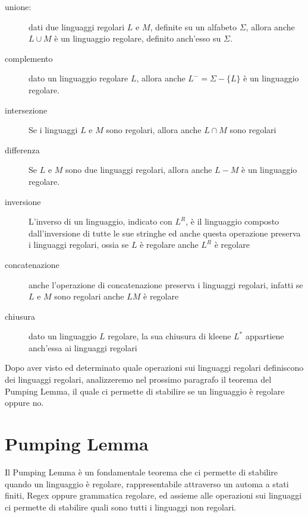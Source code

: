 \documentclass[a4paper]{book}
\theoremstyle{definition}%
\begin{document}
\begin{description}
\item [unione:] dati due linguaggi regolari $L$ e $M$, definite su un alfabeto $\Sigma$,
                allora anche $L \cup M$ è un linguaggio regolare, definito anch'esso su $\Sigma$.

\item [complemento] dato un linguaggio regolare $L$, allora anche $L^- = \Sigma - \{L\}$ è un linguaggio regolare.

\item [intersezione] Se i linguaggi $L$ e $M$ sono regolari, allora anche $L \cap M$ sono regolari

\item [differenza] Se $L$ e $M$ sono due linguaggi regolari, allora anche $L - M$ è un linguaggio regolare.

\item [inversione] L'inverso di un linguaggio, indicato con $L^R$, è il linguaggio composto dall'inversione di tutte le sue stringhe
  ed anche questa operazione preserva i linguaggi regolari, ossia se $L$ è regolare anche $L^R$ è regolare

\item [concatenazione] anche l'operazione di concatenazione preserva i linguaggi regolari, infatti se $L$ e $M$ sono regolari anche $LM$ è regolare

\item [chiusura] dato un linguaggio $L$ regolare, la sua chiusura di kleene $L^*$ appartiene anch'essa ai linguaggi regolari
\end{description}
Dopo aver visto ed determinato quale operazioni sui linguaggi regolari definiscono dei linguaggi regolari, analizzeremo nel prossimo paragrafo
il teorema del Pumping Lemma, il quale ci permette di stabilire se un linguaggio è regolare oppure no.

\section{Pumping Lemma}
Il Pumping Lemma è un fondamentale teorema che ci permette di stabilire quando un linguaggio è regolare, rappresentabile attraverso un automa
a stati finiti, Regex oppure grammatica regolare, ed assieme alle operazioni sui linguaggi ci permette di stabilire
quali sono tutti i linguaggi non regolari.
\end{document}
